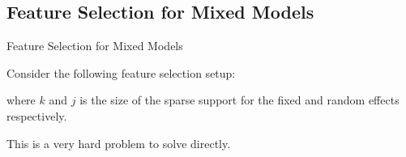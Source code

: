\documentclass[8pt]{beamer}
\begin{document}
\subsection{Feature Selection for Mixed Models}
\begin{frame}{Feature Selection for Mixed Models}

Consider the following feature selection setup:


where $k$ and $j$ is the size of the sparse support for the fixed and random effects respectively.

This is a very hard problem to solve directly.

\end{frame}
\end{document}
